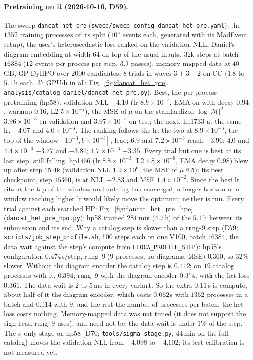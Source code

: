 \documentclass[11pt]{article}
\newcommand{\code}[1]{\texttt{#1}}
\begin{document}
\paragraph{Pretraining on it (2026-10-16, D59).} The sweep \code{dancat\_het\_pre}
(\code{sweep/sweep\_config\_dancat\_het\_pre.yaml}): the $1352$ training processes of its split ($10^5$ events each,
generated with its MadEvent setup), the user's heteroscedastic loss ranked on the validation NLL, Daniel's diagram
embedding at width $64$ on top of the usual inputs, $32$k steps at batch $16384$ ($12$ events per process per step,
$3.9$ passes), memory-mapped data at $40$\,GB, GP DyHPO over $2000$ candidates, $8$ trials in waves $3+3+2$ on CC
($1.8$ to $5.1$\,h each, $37$ GPU-h in all; Fig.~\ref{fig:dancat_het_pre}, \code{analysis/catalog\_daniel/dancat\_het\_pre.py}).
Best, the per-process pretraining (hp58): validation NLL $-4.10$ (lr $8.9\times10^{-3}$, EMA on with decay $0.94$, warmup $0.16$, L2
$5\times10^{-7}$), the MSE of $\mu$ on the standardized $\log|\mathcal M|^2$ $3.96\times10^{-3}$ on validation and
$3.97\times10^{-3}$ on test; the next, hp1733 at the same lr, $-4.07$ and $4.0\times10^{-3}$. The ranking follows the lr:
the two at $8.9\times10^{-3}$, the top of the window $[10^{-3},9\times10^{-3}]$, lead; $6.9$ and $7.2\times10^{-3}$ reach
$-3.96$; $4.0$ and $4.4\times10^{-3}$ $-3.77$ and $-3.84$; $1.7\times10^{-3}$ $-3.35$. Every trial but one is best at its
last step, still falling. hp1466 (lr $8.8\times10^{-3}$, L2 $4.8\times10^{-8}$, EMA decay $0.98$) blew up after step
$15.4$k (validation NLL $1.9\times10^{6}$, the MSE of $\mu$ $6.5$); its best checkpoint, step $15360$, is at NLL $-2.83$
and MSE $1.4\times10^{-2}$. Since the best lr sits at the top of the window and nothing has converged, a longer horizon or
a window reaching higher lr would likely move the optimum; neither is run. Every trial against each searched HP:
Fig.~\ref{fig:dancat_het_pre_hpo} (\code{dancat\_het\_pre\_hpo.py}); hp58 trained $281$\,min ($4.7$\,h) of the $5.1$\,h
between its submission and its end. Why a catalog step is slower than a rung-9 step (D79;
\code{scripts/job\_step\_profile.sh}, $500$ steps each on one V100, batch $16384$, the data wait against the step's
compute from \code{LLOCA\_PROFILE\_STEP}): hp58's configuration $0.474$\,s/step, rung~9 ($9$ processes, no diagrams,
MSE) $0.360$, so $32\%$ slower. Without the diagram encoder the catalog step is $0.412$; on $19$ catalog processes
with it, $0.394$; rung~9 with the diagram encoder $0.374$, with the het loss $0.361$. The data wait is $2$ to $5$\,ms in
every variant. So the extra $0.11$\,s is compute, about half of it the diagram encoder, which costs $0.062$\,s with
$1352$ processes in a batch and $0.014$ with $9$, and the rest the number of processes per batch; the het loss costs
nothing. Memory-mapped data was not timed (it does not support the sign head rung~9 uses), and need not be: the data
wait is under $1\%$ of the step. The $\sigma$-only stage on hp58 (D70; \code{tools/sigma\_stage.py}, $44$\,min on the full catalog) moves the
validation NLL from $-4.098$ to $-4.102$; its test calibration is not measured yet.
\end{document}
